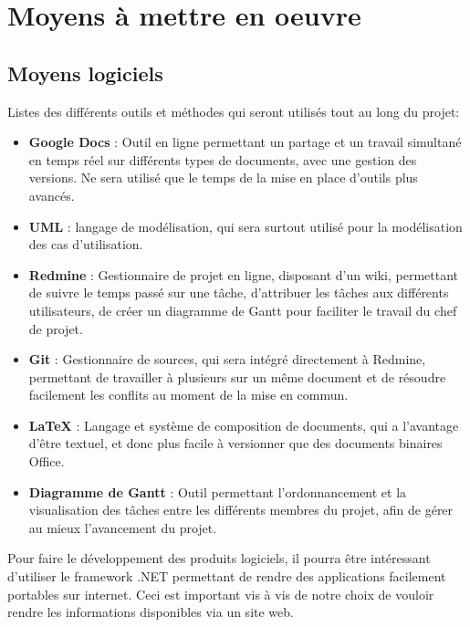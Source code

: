\section{Moyens à mettre en oeuvre}

\subsection{Moyens logiciels}
Listes des différents outils et méthodes qui seront utilisés tout au long du projet:
\begin{itemize}
\item \textbf{Google Docs} : Outil en ligne permettant un partage et un travail simultané en temps réel sur différents types de documents, avec une gestion des versions. Ne sera utilisé que le temps de la mise en place d’outils plus avancés.
\item \textbf{UML} : langage de modélisation, qui sera surtout utilisé pour la modélisation des cas d’utilisation.
\item \textbf{Redmine} : Gestionnaire de projet en ligne, disposant d’un wiki, permettant de suivre le temps passé sur une tâche, d’attribuer les tâches aux différents utilisateurs, de créer un  diagramme de Gantt pour faciliter le travail du chef de projet.
\item \textbf{Git} : Gestionnaire de sources, qui sera intégré directement à Redmine, permettant de travailler à plusieurs sur un même document et de résoudre facilement les conflits au moment de la mise en commun.
\item \textbf{LaTeX} : Langage et système de composition de documents, qui a l’avantage d’être textuel, et donc plus facile à versionner que des documents binaires Office.
\item \textbf{Diagramme de Gantt } : Outil permettant l’ordonnancement et la visualisation des tâches entre les différents membres du projet, afin de gérer au mieux l’avancement du projet.
\end{itemize}
Pour faire le développement des produits logiciels, il pourra être intéressant d'utiliser le framework .NET permettant de rendre des applications facilement portables sur internet. Ceci est important vis à vis de notre choix de vouloir rendre les informations disponibles via un site web.


